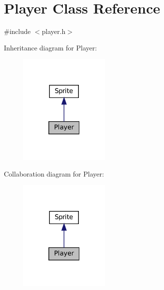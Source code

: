 \hypertarget{classPlayer}{}\section{Player Class Reference}
\label{classPlayer}


{\ttfamily \#include $<$player.\+h$>$}



Inheritance diagram for Player\+:\nopagebreak
\begin{figure}[H]
\begin{center}
\leavevmode
\includegraphics[width=127pt]{classPlayer__inherit__graph}
\end{center}
\end{figure}


Collaboration diagram for Player\+:\nopagebreak
\begin{figure}[H]
\begin{center}
\leavevmode
\includegraphics[width=127pt]{classPlayer__coll__graph}
\end{center}
\end{figure}
